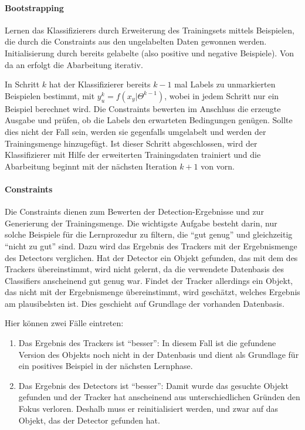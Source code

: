 	\paragraph{Bootstrapping}
	Lernen das Klassifizierers durch Erweiterung des Trainingsets mittels Beispielen, die durch die Constraints aus den ungelabelten Daten gewonnen werden. Initialisierung durch bereits gelabelte (also positive und negative Beispiele). Von da an erfolgt die Abarbeitung iterativ.

	In Schritt $k$ hat der Klassifizierer bereits $k-1$ mal Labels zu unmarkierten Beispielen bestimmt, mit $y_{u}^{k}=f(x_{y}|\Theta^{k-1})$, wobei in jedem Schritt nur ein Beispiel berechnet wird. Die Constraints bewerten im Anschluss die erzeugte Ausgabe und prüfen, ob die Labels den erwarteten Bedingungen genügen. Sollte dies nicht der Fall sein, werden sie gegenfalls umgelabelt und werden der Trainingsmenge hinzugefügt. Ist dieser Schritt abgeschlossen, wird der Klassifizierer mit Hilfe der erweiterten Trainingsdaten trainiert und die Abarbeitung beginnt mit der nächsten Iteration $k+1$ von vorn.

	\paragraph{Constraints}
	Die Constraints dienen zum Bewerten der Detection-Ergebnisse und zur Generierung der Trainingsmenge. Die wichtigste Aufgabe besteht darin, nur solche Beispiele für die Lernprozedur zu filtern, die ``gut genug'' und gleichzeitig ``nicht zu gut'' sind. Dazu wird das Ergebnis des Trackers mit der Ergebnismenge des Detectors verglichen. Hat der Detector ein Objekt gefunden, das mit dem des Trackers übereinstimmt, wird nicht gelernt, da die verwendete Datenbasis des Classifiers anscheinend gut genug war. Findet der Tracker allerdings ein Objekt, das nicht mit der Ergebnismenge übereinstimmt, wird geschätzt, welches Ergebnis am plausibelsten ist. Dies geschieht auf Grundlage der vorhanden Datenbasis.

	Hier können zwei Fälle eintreten:
	\begin{enumerate}
	\item Das Ergebnis des Trackers ist ``besser'': In diesem Fall ist die gefundene Version des Objekts noch nicht in der Datenbasis und dient als Grundlage für ein positives Beispiel in der nächsten Lernphase.
	\item Das Ergebnis des Detectors ist ``besser'': Damit wurde das gesuchte Objekt gefunden und der Tracker hat anscheinend aus unterschiedlichen Gründen den Fokus verloren. Deshalb muss er reinitialisiert werden, und zwar auf das Objekt, das der Detector gefunden hat.
	\end{enumerate} 

